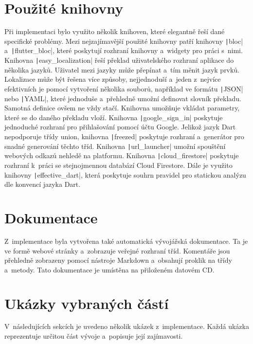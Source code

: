\section{Použité knihovny}

Při implementaci bylo využito několik knihoven,
které elegantně řeší dané specifické problémy.
Mezi nejzajímavější použité knihovny patří knihovny
\texttt|bloc| a~\texttt|flutter_bloc|,
které poskytují rozhraní knihovny a~widgety pro práci s~nimi.
Knihovna \texttt|easy_localization| řeší překlad uživatelského
rozhraní aplikace do několika jazyků.
Uživatel mezi jazyky může přepínat a~tím měnit jazyk prvků.
Lokalizace může být řešena více způsoby,
nejjednoduší a~jeden z~nejvíce efektivních je pomocí vytvoření několika souborů,
například ve formátu \texttt|JSON| nebo \texttt|YAML|,
které jednoduše a~přehledně umožní definovat slovník překladu.
Samotná definice ovšem ne vždy stačí.
Knihovna umožňuje vkládat parametry, které se do daného překladu vloží.
Knihovna \texttt|google_sign_in| poskytuje jednoduché rozhraní pro
přihlašování pomocí účtu Google.
Jelikož jazyk Dart nepodporuje třídy union,
knihovna \texttt|freezed| poskytuje rozhraní a~generátor pro
snadné generování těchto tříd.
Knihovna \texttt|url_launcher| umožní spouštění webových odkazů
nehledě na platformu.
Knihovna \texttt|cloud_firestore| poskytuje rozhraní k~práci se
stejnojmennou databází Cloud Firestore.
Dále je využito knihovny \texttt|effective_dart|,
která poskytuje souhrn pravidel pro statickou analýzu dle konvencí jazyka Dart.

\section{Dokumentace}

Z~implementace byla vytvořena také automatická vývojářská dokumentace.
Ta je ve formě webové stránky a~zobrazuje veřejné rozhraní tříd.
Komentáře jsou přehledně zobrazeny pomocí nástroje Markdown a~obsahují proklik
na třídy a~metody.
Tato dokumentace je umístěna na přiloženém datovém CD.

\section{Ukázky vybraných částí}

V~následujících sekcích je uvedeno několik ukázek z~implementace.
Každá ukázka reprezentuje určitou část vývoje a~popisuje její zajímavosti.

